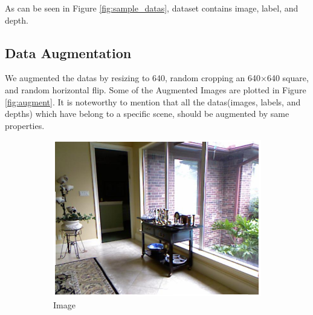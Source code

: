 \documentclass[a4paper, openany]{book}
\begin{document}
As can be seen in Figure \ref{fig:sample_datas}, dataset contains image, label, and depth.

\newpage

\subsection{Data Augmentation}
	\vspace{0.3cm}
We augmented the datas by resizing to 640, random cropping an 640$\times$640 square, and random horizontal flip. Some of the Augmented Images are plotted in Figure \ref{fig:augment}. It is noteworthy to mention that all the datas(images, labels, and depths) which have belong to a specific scene, should be augmented by same properties.



\begin{figure}[ht]
  \centering
  \begin{subfigure}[b]{0.3\linewidth}
    \includegraphics[width=\linewidth]{images/imgNo1272.png}
    \caption{Image}
  \end{subfigure}
  \begin{subfigure}[b]{0.3\linewidth}

\end{subfigure}
\end{figure}
\end{document}
